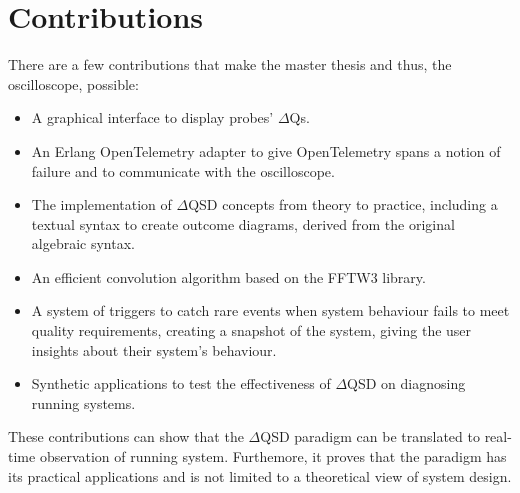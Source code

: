 \section{Contributions}
    There are a few contributions that make the master thesis and thus, the oscilloscope, possible:
    \begin{itemize}
        \item A graphical interface to display probes' $\Delta$Qs.
        \item An Erlang OpenTelemetry adapter to give OpenTelemetry spans a notion of failure and to communicate with the oscilloscope.
        \item The implementation of $\Delta$QSD concepts from theory to practice, including a textual syntax to create outcome diagrams, derived from the original algebraic syntax.
        \item An efficient convolution algorithm based on the FFTW3 library.
        \item A system of triggers to catch rare events when system behaviour fails to meet quality requirements, creating a snapshot of the system, giving the user insights about their system's behaviour.
        \item Synthetic applications to test the effectiveness of $\Delta$QSD on diagnosing running systems.
    \end{itemize}
    These contributions can show that the $\Delta$QSD paradigm can be translated to real-time observation of running system. Furthemore, it proves that the paradigm has its practical applications and is not limited to a theoretical view of system design.

